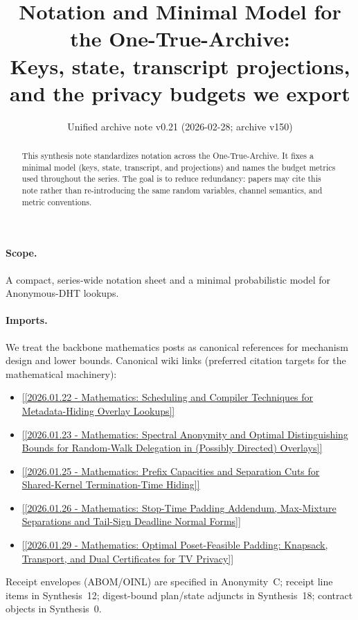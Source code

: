 \documentclass[11pt]{article}
\title{Notation and Minimal Model for the One-True-Archive:\\
\large Keys, state, transcript projections, and the privacy budgets we export}
\author{}
\date{Unified archive note v0.21 (2026-02-28; archive v150)}
\begin{document}
\maketitle

\begin{abstract}
This synthesis note standardizes notation across the One-True-Archive.
It fixes a minimal model (keys, state, transcript, and projections) and names the budget metrics used throughout the series.
The goal is to reduce redundancy: papers may cite this note rather than re-introducing the same random variables, channel semantics, and metric conventions.
\end{abstract}

\paragraph{Scope.}
A compact, series-wide notation sheet and a minimal probabilistic model for Anonymous-DHT lookups.

\paragraph{Imports.}
We treat the backbone mathematics posts as canonical references for mechanism design and lower bounds.
Canonical wiki links (preferred citation targets for the mathematical machinery):
\begin{itemize}[leftmargin=1.2em]
\item \url{[[2026.01.22 - Mathematics: Scheduling and Compiler Techniques for Metadata-Hiding Overlay Lookups]]}
\item \url{[[2026.01.23 - Mathematics: Spectral Anonymity and Optimal Distinguishing Bounds for Random-Walk Delegation in (Possibly Directed) Overlays]]}
\item \url{[[2026.01.25 - Mathematics: Prefix Capacities and Separation Cuts for Shared-Kernel Termination-Time Hiding]]}
\item \url{[[2026.01.26 - Mathematics: Stop-Time Padding Addendum, Max-Mixture Separations and Tail-Sign Deadline Normal Forms]]}
\item \url{[[2026.01.29 - Mathematics: Optimal Poset-Feasible Padding: Knapsack, Transport, and Dual Certificates for TV Privacy]]}
\end{itemize}

\noindent Receipt envelopes (ABOM/OINL) are specified in Anonymity~C; receipt line items in Synthesis~12; digest-bound plan/state adjuncts in Synthesis~18; contract objects in Synthesis~0.\cite{series:abomoinl,series:receiptitems,series:planstateequiv,series:contractobjects}
\end{document}
